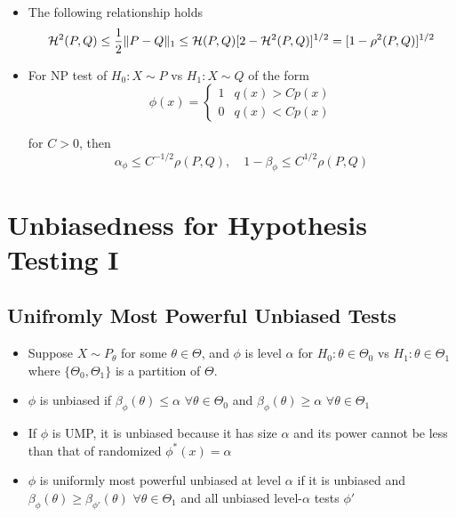 \documentclass[fontsize=5pt]{scrartcl}
\begin{document}
\begin{multicols}{2}
\begin{itemize}
\item  The following relationship holds
  \begin{equation}
    {\cal H}^{2}(P,Q) \leq\frac{1}{2}\|P-Q\|_{1}\leq{\cal
      H}(P,Q)[2-{\cal H}^{2}(P,Q)]^{1/2} = [1-\rho^{2}(P,Q)]^{1/2}
  \end{equation}

\item For NP test of $H_{0}:X\sim P$ vs $H_{1}:X\sim Q$ of the form
  \begin{equation}
    \phi(x) = \begin{cases} 1 & q(x)>Cp(x) \\
      0 & q(x)<Cp(x) \end{cases}
  \end{equation}

  for $C>0$, then
  \begin{equation}
    \alpha_{\phi}\leq C^{-1/2}\rho(P,Q),\quad 1-\beta_{\phi}\leq C^{1/2}\rho(P,Q)
  \end{equation}
\end{itemize}

\section{Unbiasedness for Hypothesis Testing I}

\subsection{Unifromly Most Powerful Unbiased Tests}

\begin{itemize}
\item Suppose $X\sim P_{\theta}$ for some $\theta\in\Theta$, and
  $\phi$ is level $\alpha$ for $H_{0}:\theta\in\Theta_{0}$ vs
  $H_{1}:\theta\in\Theta_{1}$ where $\{\Theta_{0},\Theta_{1}\}$ is a
  partition of $\Theta$.

\item $\phi$ is unbiased if $\beta_{\phi}(\theta)\leq\alpha$
  $\forall\theta\in\Theta_{0}$ and $\beta_{\phi}(\theta)\geq\alpha$
  $\forall\theta\in\Theta_{1}$
\item If $\phi$ is UMP, it is unbiased because it has size $\alpha$
  and its power cannot be less than that of randomized
  $\phi^{*}(x)=\alpha$

\item $\phi$ is uniformly most powerful unbiased at level $\alpha$ if
  it is unbiased and $\beta_{\phi}(\theta)\geq\beta_{\phi'}(\theta)$
  $\forall\theta\in\Theta_{1}$ and all unbiased level-$\alpha$ tests
  $\phi'$


\end{itemize}
\end{multicols}
\end{document}
